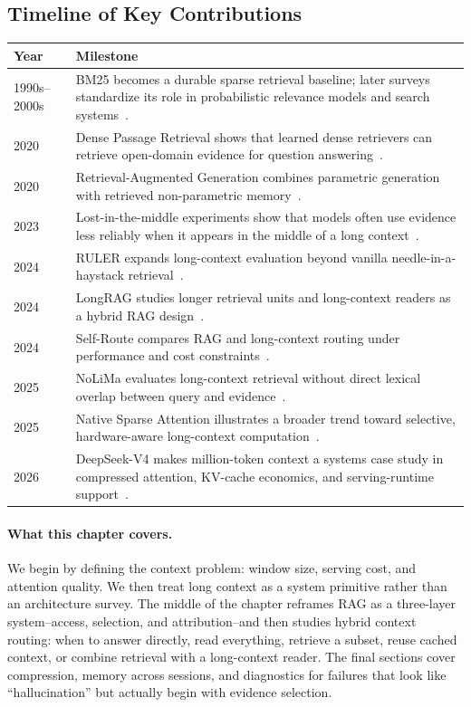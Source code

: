 \subsection*{Timeline of Key Contributions}

\begin{center}
\begin{tabularx}{\textwidth}{@{}lX@{}}
\toprule
\textbf{Year} & \textbf{Milestone} \\
\midrule
1990s--2000s & BM25 becomes a durable sparse retrieval baseline; later surveys standardize its role in probabilistic relevance models and search systems~\cite{robertson2009probabilistic}. \\
2020 & Dense Passage Retrieval shows that learned dense retrievers can retrieve open-domain evidence for question answering~\cite{karpukhin2020dpr}. \\
2020 & Retrieval-Augmented Generation combines parametric generation with retrieved non-parametric memory~\cite{lewis2020rag}. \\
2023 & Lost-in-the-middle experiments show that models often use evidence less reliably when it appears in the middle of a long context~\cite{liu2023lost}. \\
2024 & RULER expands long-context evaluation beyond vanilla needle-in-a-haystack retrieval~\cite{hsieh2024ruler}. \\
2024 & LongRAG studies longer retrieval units and long-context readers as a hybrid RAG design~\cite{jiang2024longrag}. \\
2024 & Self-Route compares RAG and long-context routing under performance and cost constraints~\cite{li2024raglongcontext}. \\
2025 & NoLiMa evaluates long-context retrieval without direct lexical overlap between query and evidence~\cite{modarressi2025nolima}. \\
2025 & Native Sparse Attention illustrates a broader trend toward selective, hardware-aware long-context computation~\cite{yuan2025nsa}. \\
2026 & DeepSeek-V4 makes million-token context a systems case study in compressed attention, KV-cache economics, and serving-runtime support~\cite{deepseek2026v4release,deepseek2026v4hf,vllm2026deepseekv4}. \\
\bottomrule
\end{tabularx}
\end{center}

\paragraph{What this chapter covers.} We begin by defining the context problem: window size, serving cost, and attention quality. We then treat long context as a system primitive rather than an architecture survey. The middle of the chapter reframes RAG as a three-layer system--access, selection, and attribution--and then studies hybrid context routing: when to answer directly, read everything, retrieve a subset, reuse cached context, or combine retrieval with a long-context reader. The final sections cover compression, memory across sessions, and diagnostics for failures that look like ``hallucination'' but actually begin with evidence selection.


